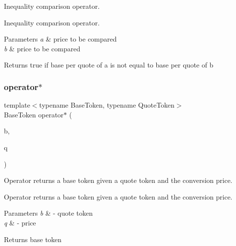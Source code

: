 Inequality comparison operator. 

Inequality comparison operator. 
\begin{DoxyParams}{Parameters}
{\em a} & price to be compared \\
\hline
{\em b} & price to be compared \\
\hline
\end{DoxyParams}
\begin{DoxyReturn}{Returns}
true if base per quote of a is not equal to base per quote of b 
\end{DoxyReturn}
\mbox{\label{structaacio_1_1price_ab3db8af0092dbe87a5dab8505052a750}} 
\subsubsection{\texorpdfstring{operator$\ast$}{operator*}}
{\footnotesize\ttfamily template$<$typename Base\+Token, typename Quote\+Token$>$ \\
Base\+Token operator$\ast$ (\begin{DoxyParamCaption}\item[{const Quote\+Token \&}]{b,  }\item[{const \mbox{\hyperlink{structaacio_1_1price}{price}}$<$ Base\+Token, Quote\+Token $>$ \&}]{q }\end{DoxyParamCaption})\hspace{0.3cm}{\ttfamily [friend]}}



Operator returns a base token given a quote token and the conversion price. 

Operator returns a base token given a quote token and the conversion price. 
\begin{DoxyParams}{Parameters}
{\em b} & -\/ quote token \\
\hline
{\em q} & -\/ price \\
\hline
\end{DoxyParams}
\begin{DoxyReturn}{Returns}
base token 
\end{DoxyReturn}
\mbox{\label{structaacio_1_1price_a00f8a553edbab3956c82bdd37d435395}} 
